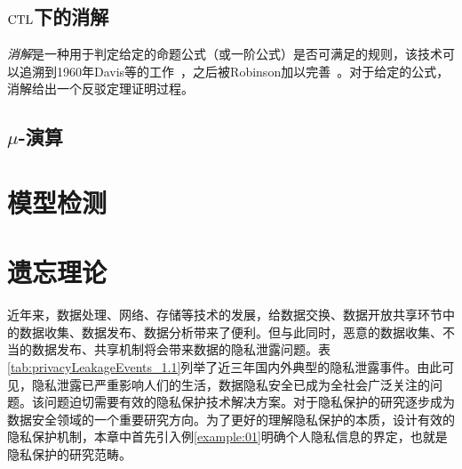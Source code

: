 


\subsection{$\textrm{CTL}$下的消解}

\emph{消解}是一种用于判定给定的命题公式（或一阶公式）是否可满足的规则，该技术可以追溯到1960年Davis等的工作~\cite{DBLP:journals/jacm/DavisP60}，之后被Robinson加以完善~\cite{DBLP:journals/jacm/Robinson65}。对于给定的公式，消解给出一个反驳定理证明过程。

\subsection{$\mu$-演算}


\section{模型检测}


\section{遗忘理论}







近年来，数据处理、网络、存储等技术的发展，给数据交换、数据开放共享环节中的数据收集、数据发布、数据分析带来了便利。但与此同时，恶意的数据收集、不当的数据发布、共享机制将会带来数据的隐私泄露问题。表\ref{tab:privacyLeakageEvents_1.1}列举了近三年国内外典型的隐私泄露事件。由此可见，隐私泄露已严重影响人们的生活，数据隐私安全已成为全社会广泛关注的问题。该问题迫切需要有效的隐私保护技术解决方案。对于隐私保护的研究逐步成为数据安全领域的一个重要研究方向。为了更好的理解隐私保护的本质，设计有效的隐私保护机制，本章中首先引入例\ref{example:01}明确个人隐私信息的界定，也就是隐私保护的研究范畴。

